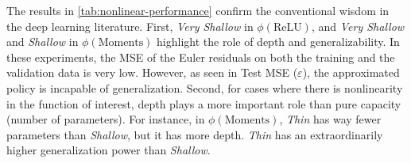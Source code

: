 \documentclass[12pt]{article}
\begin{document}
The results in \cref{tab:nonlinear-performance} confirm the conventional wisdom in the deep learning literature. First, {\it Very Shallow} in $\phi(\text{ReLU})$, and {\it Very Shallow} and {\it Shallow} in $\phi(\text{Moments})$ highlight the role of depth and generalizability. In these experiments, the MSE of the Euler residuals on both the training and the validation data is very low. However, as seen in Test MSE ($\varepsilon$), the approximated policy is incapable of generalization. Second, for cases where there is nonlinearity in the function of interest, depth plays a more important role than pure capacity (number of parameters). For instance, in $\phi(\text{Moments})$, {\it Thin} has way fewer parameters than {\it Shallow}, but it has more depth. {\it Thin} has an extraordinarily higher generalization power than {\it Shallow}.     


%
\end{document}
